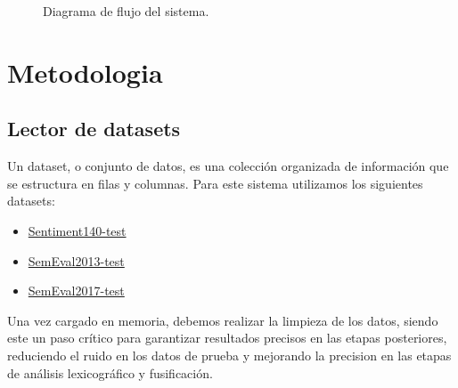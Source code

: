 \documentclass[sigconf, review=false, nonacm]{acmart}
\begin{document}
\begin{figure}[ht]
	\centering
	\caption{Diagrama de flujo del sistema.}
	\label{fig:flow-diagram}
\end{figure}

\section{Metodologia}
\subsection{Lector de datasets}
Un dataset, o conjunto de datos, es una colección organizada de información que se estructura en filas y
columnas. Para este sistema utilizamos los siguientes datasets:
\begin{itemize}
	\item \href{https://www.kaggle.com/datasets/krishbaisoya/tweets-sentiment-analysis}{Sentiment140-test}
	\item
	      \href{https://www.kaggle.com/datasets/azzouza2018/semevaldatadets?resource=download&select=semeval-2013-test.csv}{SemEval2013-test}
	\item
	      \href{https://www.kaggle.com/datasets/azzouza2018/semevaldatadets?resource=download&select=semeval-2017-test.csv}{SemEval2017-test}
\end{itemize}

Una vez cargado en memoria, debemos realizar la limpieza de los datos, siendo este un paso crítico para
garantizar resultados precisos en las etapas posteriores, reduciendo el ruido en los datos de prueba y
mejorando la precision en las etapas de análisis lexicográfico y fusificación.\\
\end{document}
